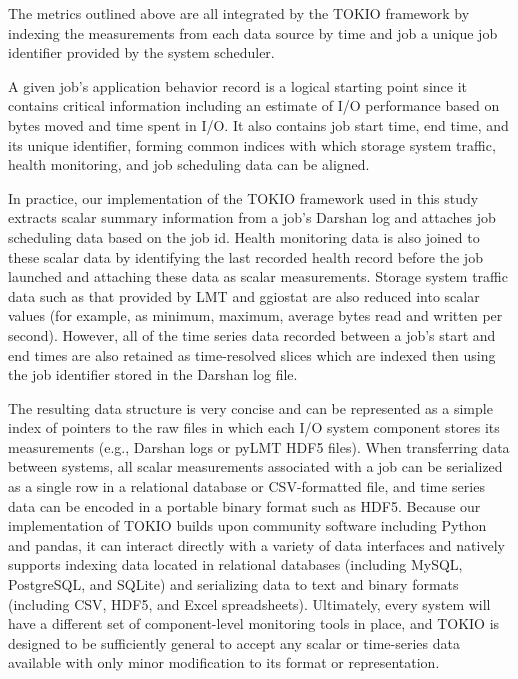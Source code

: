 The metrics outlined above are all integrated by the TOKIO framework by indexing the measurements from each data source by time and job a unique job identifier provided by the system scheduler.

A given job's application behavior record is a logical starting point since it contains critical information including an estimate of I/O performance based on bytes moved and time spent in I/O.  It also contains job start time, end time, and its unique identifier, forming common indices with which storage system traffic, health monitoring, and job scheduling data can be aligned.

In practice, our implementation of the TOKIO framework used in this study  extracts scalar summary information from a job's Darshan log and attaches job scheduling data based on the job id.
Health monitoring data is also joined to these scalar data by identifying the last recorded health record before the job launched and attaching these data as scalar measurements.
Storage system traffic data such as that provided by LMT and ggiostat are also reduced into scalar values (for example, as minimum, maximum, average bytes read and written per second).
However, all of the time series data recorded between a job's start and end times are also retained as time-resolved slices which are indexed then using the job identifier stored in the Darshan log file.

The resulting data structure is very concise and can be represented as a simple index of pointers to the raw files in which each I/O system component stores its measurements (e.g., Darshan logs or pyLMT HDF5 files).
When transferring data between systems, all scalar measurements associated with a job can be serialized as a single row in a relational database or CSV-formatted file, and time series data can be encoded in a portable binary format such as HDF5.
Because our implementation of TOKIO builds upon community software including Python and pandas, it can interact directly with a variety of data interfaces and
natively supports indexing data located in relational databases (including MySQL, PostgreSQL, and SQLite) and serializing data to text and binary formats (including CSV, HDF5, and Excel spreadsheets).  Ultimately, every system will have a different set of component-level monitoring tools in place, and TOKIO is designed to be sufficiently general to accept any scalar or time-series data available with only minor modification to its format or representation.

